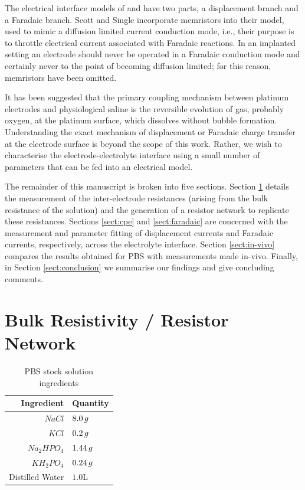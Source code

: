 \documentclass[journal, a4paper]{IEEEtran}
\begin{document}
The electrical interface models of \cite{Franks2005} and \cite{ScottSingle2013} have two parts, a displacement branch and a Faradaic branch.
Scott and Single incorporate memristors into their model, used to mimic a diffusion limited current conduction mode, i.e., their purpose is to throttle electrical current associated with Faradaic reactions.
In an implanted setting an electrode should never be operated in a Faradaic conduction mode and certainly never to the point of becoming diffusion limited; for this reason, memristors have been omitted.

It has been suggested that the primary coupling mechanism between platinum electrodes and physiological saline is the reversible evolution of gas, probably oxygen, at the platinum surface, which dissolves without bubble formation.~\cite{Greatbatch1969}
Understanding the exact mechanism of displacement or Faradaic charge transfer at the electrode surface is beyond the scope of this work.
Rather, we wish to characterise the electrode-electrolyte interface using a small number of parameters that can be fed into an electrical model.

The remainder of this manuscript is broken into five sections.
Section \ref{sect:resistorMesh} details the measurement of the inter-electrode resistances (arising from the bulk resistance of the solution) and the generation of a resistor network to replicate these resistances.
Sections \ref{sect:cpe} and \ref{sect:faradaic} are concerned with the measurement and parameter fitting of displacement currents and Faradaic currents, respectively, across the electrolyte interface.
Section \ref{sect:in-vivo} compares the results obtained for PBS with measurements made in-vivo.
Finally, in Section \ref{sect:conclusion} we summarise our findings and give concluding comments.


\section{Bulk Resistivity / Resistor Network }
\label{sect:resistorMesh}

\begin{table}
    \caption{PBS stock solution ingredients}
    \label{tab:PBSrecipe}
    \begin{center}
        \begin{tabular}{r | l}
            Ingredient & Quantity \\
            \hline
            $NaCl$ & $8.0\thinspace g$ \\
            $KCl$ & $0.2\thinspace g$ \\
            $Na_{2}HPO_{4}$ & $1.44\thinspace g$ \\
            $KH_{2}PO_{4}$ & $0.24\thinspace g$ \\
            Distilled Water & $1.0$\thinspace L \\
        \end{tabular}
    \end{center}
\end{table}
\end{document}
